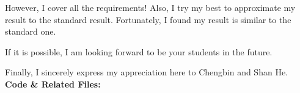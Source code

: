 \documentclass[titlepage,a4paper,12pt,thmsb]{report}
\begin{document}
However, I cover all the requirements!  Also, I try my best to approximate my result to the standard result.  Fortunately, I found my result is similar to the standard one.

If it is possible, I am looking forward to be your students in the future. 

Finally, I sincerely express my appreciation here to Chengbin and Shan He.
\vspace*{0.5cm}\\
{\large \bf {Code \& Related Files:}}
\newline{}
{ }



\end{document}
